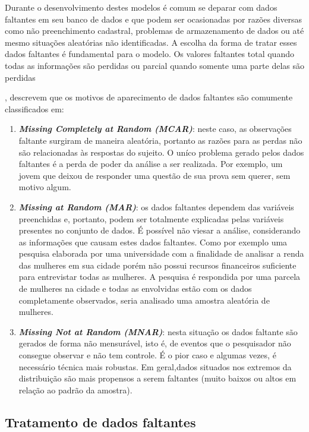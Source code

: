 \documentclass[
]{book}
\begin{document}
Durante o desenvolvimento destes modelos é comum se deparar com dados faltantes em seu banco de dados e que podem ser ocasionadas por razões diversas como não preenchimento cadastral, problemas de armazenamento de dados ou até mesmo situações aleatórias não identificadas. A escolha da forma de tratar esses dados faltantes é fundamental para o modelo. Os valores faltantes total quando todas as informações são perdidas ou parcial quando somente uma parte delas são perdidas

\citep{little2019statistical}, descrevem que os motivos de aparecimento de dados faltantes são comumente classificados em:

\begin{enumerate}
\def\labelenumi{\arabic{enumi}.}
\item
  \textbf{\emph{Missing Completely at Random (MCAR)}}: neste caso, as observações faltante surgiram de maneira aleatória, portanto as razões para as perdas não são relacionadas às respostas do sujeito. O uníco problema gerado pelos dados faltantes é a perda de poder da análise a ser realizada. Por exemplo, um jovem que deixou de responder uma questão de sua prova sem querer, sem motivo algum.
\item
  \textbf{\emph{Missing at Random (MAR)}}: os dados faltantes dependem das variáveis preenchidas e, portanto, podem ser totalmente explicadas pelas variáveis presentes no conjunto de dados. É possível não viesar a análise, considerando as informações que causam estes dados faltantes. Como por exemplo uma pesquisa elaborada por uma universidade com a finalidade de analisar a renda das mulheres em sua cidade porém não possui recursos financeiros suficiente para entrevistar todas as mulheres. A pesquisa é respondida por uma parcela de mulheres na cidade e todas as envolvidas estão com os dados completamente observados, seria analisado uma amostra aleatória de mulheres.
\item
  \textbf{\emph{Missing Not at Random (MNAR)}}: nesta situação os dados faltante são gerados de forma não mensurável, isto é, de eventos que o pesquisador não consegue observar e não tem controle. É o pior caso e algumas vezes, é necessário técnica mais robustas. Em geral,dados situados nos extremos da distribuição são mais propensos a serem faltantes (muito baixos ou altos em relação ao padrão da amostra).
\end{enumerate}

\hypertarget{tratamento-de-dados-faltantes}{%
\subsection{Tratamento de dados faltantes}\label{tratamento-de-dados-faltantes}}
\end{document}
